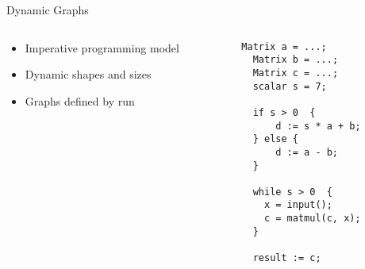 \begin{frame}[fragile]{Dynamic Graphs}
  \begin{columns}
    \begin{column}{0.55\textwidth}
      \begin{itemize}
        \item Imperative programming model
        \item Dynamic shapes and sizes
        \item Graphs defined by run
      \end{itemize}
    \end{column}
    \begin{column}{0.45\textwidth}
      \begin{lstlisting}[language=pseudoML]
  Matrix a = ...;
  Matrix b = ...;
  Matrix c = ...;
  scalar s = 7;

  if s > 0  {
      d := s * a + b;
  } else {
      d := a - b;
  }

  while s > 0  {
    x = input();
    c = matmul(c, x);
  }

  result := c;
      \end{lstlisting}
    \end{column}
  \end{columns}
\end{frame}
